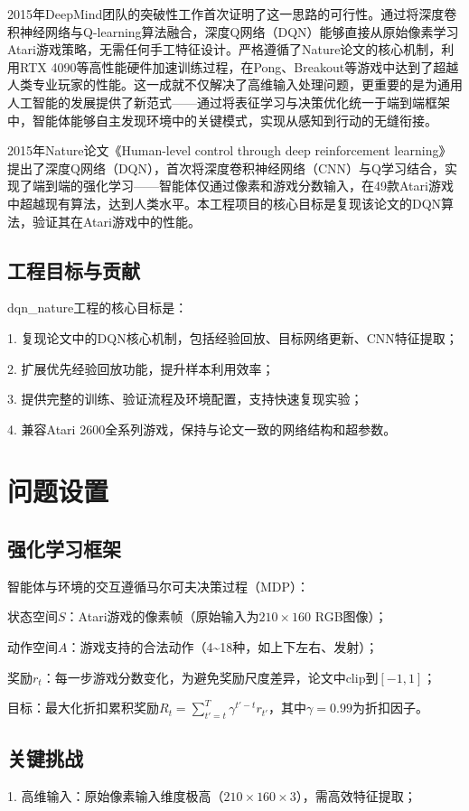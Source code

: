 \documentclass[conference]{IEEEtran}
\begin{document}
	2015年DeepMind团队的突破性工作\cite{1}首次证明了这一思路的可行性。通过将深度卷积神经网络与Q-learning算法融合，深度Q网络（DQN）能够直接从原始像素学习Atari游戏策略，无需任何手工特征设计。严格遵循了Nature论文的核心机制，利用RTX 4090等高性能硬件加速训练过程，在Pong、Breakout等游戏中达到了超越人类专业玩家的性能。这一成就不仅解决了高维输入处理问题，更重要的是为通用人工智能的发展提供了新范式——通过将表征学习与决策优化统一于端到端框架中，智能体能够自主发现环境中的关键模式，实现从感知到行动的无缝衔接。
	
	2015年Nature论文《Human-level control through deep reinforcement learning》提出了深度Q网络（DQN），首次将深度卷积神经网络（CNN）与Q学习结合，实现了端到端的强化学习——智能体仅通过像素和游戏分数输入，在49款Atari游戏中超越现有算法，达到人类水平\cite{1}。本工程项目的核心目标是复现该论文的DQN算法，验证其在Atari游戏中的性能。
	
	\subsection{工程目标与贡献}
	dqn\_nature工程的核心目标是：
	
	1. 复现论文中的DQN核心机制，包括经验回放、目标网络更新、CNN特征提取；
	
	2. 扩展优先经验回放功能，提升样本利用效率；
	
	3. 提供完整的训练、验证流程及环境配置，支持快速复现实验；
	
	4. 兼容Atari 2600全系列游戏，保持与论文一致的网络结构和超参数。
	
	\section{问题设置}
	\subsection{强化学习框架}
	智能体与环境的交互遵循马尔可夫决策过程（MDP）\cite{1}：
	
	状态空间$S$：Atari游戏的像素帧（原始输入为$210 \times 160$ RGB图像）；
	
	动作空间$A$：游戏支持的合法动作（4\textasciitilde 18种，如上下左右、发射）；
	
	奖励$r_t$：每一步游戏分数变化，为避免奖励尺度差异，论文中clip到$[-1,1]$；
	
	目标：最大化折扣累积奖励$R_t = \sum_{t'=t}^T \gamma^{t'-t} r_{t'}$，其中$\gamma=0.99$为折扣因子\cite{1}。
	
	\subsection{关键挑战}
	1. 高维输入：原始像素输入维度极高（$210 \times 160 \times 3$），需高效特征提取\cite{3}；
	
\end{document}
